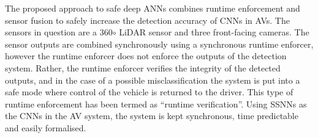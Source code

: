 The proposed approach to safe deep \acp{ANN} combines runtime enforcement and sensor fusion to safely increase the detection accuracy of \acp{CNN} in \acp{AV}.
The sensors in question are a 360$\circ$ \ac{LiDAR} sensor and three front-facing cameras.
The sensor outputs are combined synchronously using a synchronous runtime enforcer, however the runtime enforcer does not enforce the outputs of the detection system.
Rather, the runtime enforcer verifies the integrity of the detected outputs, and in the case of a possible misclassification the system is put into a safe mode where control of the vehicle is returned to the driver.
This type of runtime enforcement has been termed as ``runtime verification''.
Using \acfp{SSNN} as the \acp{CNN} in the \ac{AV} system, the system is kept synchronous, time predictable and easily formalised.















